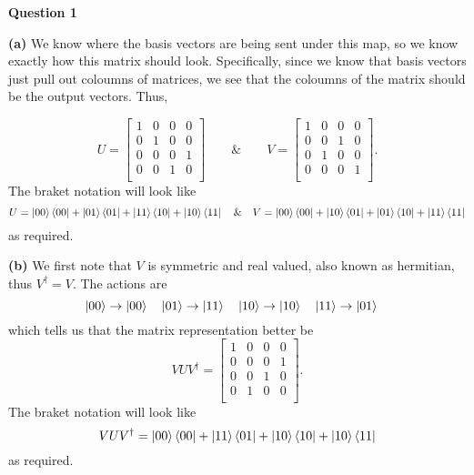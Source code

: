 \documentclass[10pt]{article}
\begin{document}
\textbf{Question 1}

\textbf{(a)} We know where the basis vectors are being sent under this map, so we know exactly how this matrix should look. Specifically, since we know that basis vectors just pull out coloumns of matrices, we see that the coloumns of the matrix should be the output vectors. Thus,

\[ U =
\begin{bmatrix}
  1 & 0 & 0 & 0 \\
  0 & 1 & 0 & 0 \\
  0 & 0 & 0 & 1 \\
  0 & 0 & 1 & 0 \\
\end{bmatrix}
\hspace{2em} \& \hspace{2em} V =
\begin{bmatrix}
  1 & 0 & 0 & 0 \\
  0 & 0 & 1 & 0 \\
  0 & 1 & 0 & 0 \\
  0 & 0 & 0 & 1 \\
\end{bmatrix}.
\]
The braket notation will look like
\[ U = \ket{00}\bra{00} + \ket{01}\bra{01} + \ket{11}\bra{10} + \ket{10}\bra{11} \hspace{1em} \& \hspace{1em} V = \ket{00}\bra{00} + \ket{10}\bra{01} + \ket{01}\bra{10} + \ket{11}\bra{11} \]
as required.

\textbf{(b)} We first note that $V$ is symmetric and real valued, also known as hermitian, thus $V^{\dagger} = V$. The actions are
\[ \ket{00} \to \ket{00} \hspace{1em} \ket{01} \to \ket{11} \hspace{1em} \ket{10} \to \ket{10} \hspace{1em} \ket{11} \to \ket{01} \hspace{1em} \]
which tells us that the matrix representation better be
\[ VUV^{\dagger} =
\begin{bmatrix}
  1 & 0 & 0 & 0 \\
  0 & 0 & 0 & 1 \\
  0 & 0 & 1 & 0 \\
  0 & 1 & 0 & 0 \\
\end{bmatrix}.
\]
The braket notation will look like
\[ VUV^{\dagger} = \ket{00}\bra{00} + \ket{11}\bra{01} + \ket{10}\bra{10} + \ket{10}\bra{11} \]
as required.
\end{document}
